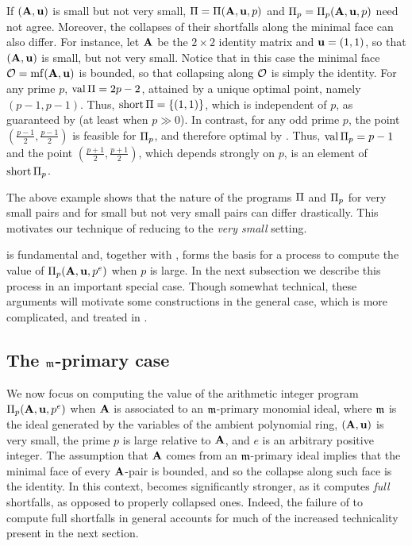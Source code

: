 \documentclass{amsart}
\begin{document}
\begin{example}
   If $(\mathbf{A}, \mathbf{u})$ is small but not very small, $\Pi = \Pi(\mathbf{A},\mathbf{u},p)$ and $\Pi_p = \Pi_p(\mathbf{A},\mathbf{u},p)$ need not agree.
   Moreover, the collapses of their shortfalls along the minimal face can also differ.
   For instance, let $\mathbf{A}$ be the $2 \times 2$ identity matrix and $\mathbf{u} = (1,1)$, so that $(\mathbf{A},\mathbf{u})$ is small, but not very small.
   Notice that in this case the minimal face $\mathcal{O} = \operatorname{mf}(\mathbf{A},\mathbf{u})$ is bounded, so that collapsing along $\mathcal{O}$ is simply the identity.
   For any prime $p$, $\operatorname{val} \Pi = 2p - 2$, attained by a unique optimal point, namely $(p-1,p-1)$.
   Thus, $\operatorname{short} \Pi = \{(1,1)\}$, which is independent of $p$, as guaranteed by   (at least when $p \gg 0$).
   In contrast, for any odd prime $p$, the point $(\frac{p-1}{2}, \frac{p-1}{2})$ is feasible for $\Pi_p$, and therefore optimal by .
   Thus, $\operatorname{val} \Pi_p = p-1$ and the point $(\frac{p+1}{2}, \frac{p+1}{2})$, which depends strongly on $p$, is an element of $\operatorname{short} \Pi_p$.
\end{example}

The above example shows that the nature of the programs $\Pi$ and $\Pi_p$ for very small pairs and for small but not very small pairs can differ drastically.
This motivates our technique of reducing to the \emph{very small} setting.

 is fundamental and, together with , forms the basis for a process to compute the value of $\Pi_p(\mathbf{A}, \mathbf{u}, p^e)$ when $p$ is large.  
In the next subsection we describe this process in an important special case.  Though somewhat technical, these arguments will motivate some constructions in the general case, which is more complicated, and treated in .

\subsection{The $\mathfrak{m}$-primary case}
\label{m-primary: SS}

We now focus on computing the value of the arithmetic integer program $\Pi_p(\mathbf{A},\mathbf{u}, p^e)$ when $\mathbf{A}$ is associated to an $\mathfrak{m}$-primary monomial ideal, where $\mathfrak{m}$ is the ideal generated by the variables of the ambient polynomial ring, $(\mathbf{A},\mathbf{u})$ is very small, the prime $p$ is large relative to $\mathbf{A}$, and $e$ is an arbitrary positive integer.
The assumption that $\mathbf{A}$ comes from an $\mathfrak{m}$-primary ideal implies that the minimal face of every $\mathbf{A}$-pair is bounded, and so the collapse along such face is the identity.
In this context,  becomes significantly stronger, as it computes \emph{full} shortfalls, as opposed to properly collapsed ones.
Indeed, the failure of  to compute full shortfalls in general accounts for much of the increased technicality present in the next section.
\end{document}
